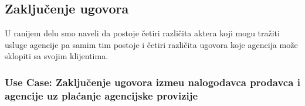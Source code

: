 \documentclass[20pt]{article}
\begin{document}
\newpage
\subsection{\bfseries \Large Zaklju\v {c}enje ugovora}
\setlength{\parindent}{1cm}
\fontsize{13}{18} \selectfont 


\indent U ranijem delu smo naveli da postoje \v {c}etiri razli\v {c}ita aktera koji mogu tra\v {z}iti usluge agencije pa samim tim postoje i \v {c}etiri razli\v {c}ita ugovora koje agencija mo\v {z}e sklopiti sa svojim klijentima. \\ 
\subsubsection{\bfseries \large Use Case: Zaklju\v {c}enje ugovora izme\dj u nalogodavca prodavca i agencije uz pla\' canje agencijske provizije}
\end{document}
